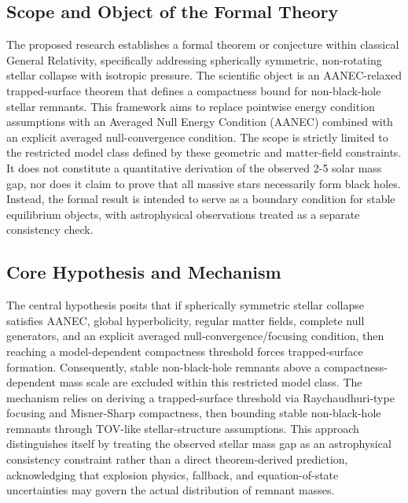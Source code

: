 \documentclass[conference]{IEEEtran}
\begin{document}
\subsection{Scope and Object of the Formal Theory}
The proposed research establishes a formal theorem or conjecture within classical General Relativity, specifically addressing spherically symmetric, non-rotating stellar collapse with isotropic pressure. The scientific object is an AANEC-relaxed trapped-surface theorem that defines a compactness bound for non-black-hole stellar remnants. This framework aims to replace pointwise energy condition assumptions with an Averaged Null Energy Condition (AANEC) combined with an explicit averaged null-convergence condition. The scope is strictly limited to the restricted model class defined by these geometric and matter-field constraints. It does not constitute a quantitative derivation of the observed 2-5 solar mass gap, nor does it claim to prove that all massive stars necessarily form black holes. Instead, the formal result is intended to serve as a boundary condition for stable equilibrium objects, with astrophysical observations treated as a separate consistency check.

\subsection{Core Hypothesis and Mechanism}
The central hypothesis posits that if spherically symmetric stellar collapse satisfies AANEC, global hyperbolicity, regular matter fields, complete null generators, and an explicit averaged null-convergence/focusing condition, then reaching a model-dependent compactness threshold forces trapped-surface formation. Consequently, stable non-black-hole remnants above a compactness-dependent mass scale are excluded within this restricted model class. The mechanism relies on deriving a trapped-surface threshold via Raychaudhuri-type focusing and Misner-Sharp compactness, then bounding stable non-black-hole remnants through TOV-like stellar-structure assumptions. This approach distinguishes itself by treating the observed stellar mass gap as an astrophysical consistency constraint rather than a direct theorem-derived prediction, acknowledging that explosion physics, fallback, and equation-of-state uncertainties may govern the actual distribution of remnant masses.
\end{document}
